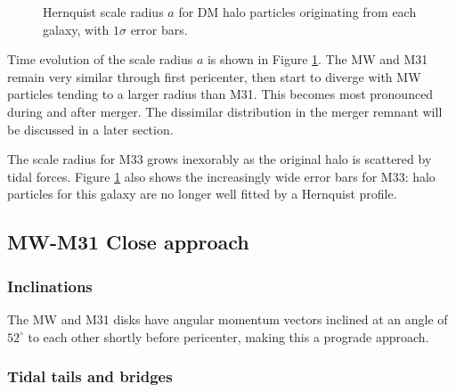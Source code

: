 \documentclass[twocolumn]{aastex63}
\begin{document}
\begin{figure}[htb!]
	\caption{Hernquist scale radius $a$ for DM halo particles originating from each galaxy, with $1\sigma$ error bars.
		\label{fig:hernquist_a}}
\end{figure}

Time evolution of the scale radius $a$ is shown in Figure \ref{fig:hernquist_a}. The MW and M31 remain very similar through first pericenter, then start to diverge with MW particles tending to a larger radius than M31. This becomes most pronounced during and after merger. The dissimilar distribution in the merger remnant will be discussed in a later section.  

The scale radius for M33 grows inexorably as the original halo is scattered by tidal forces. Figure \ref{fig:hernquist_a} also shows the increasingly wide error bars for M33: halo particles for this galaxy are no longer well fitted by a Hernquist profile.

\subsection{MW-M31 Close approach}

\subsubsection{Inclinations}

The MW and M31 disks have angular momentum vectors inclined at an angle of $52^\circ$ to each other shortly before pericenter, making this a prograde approach.



\subsubsection{Tidal tails and bridges}
\end{document}
